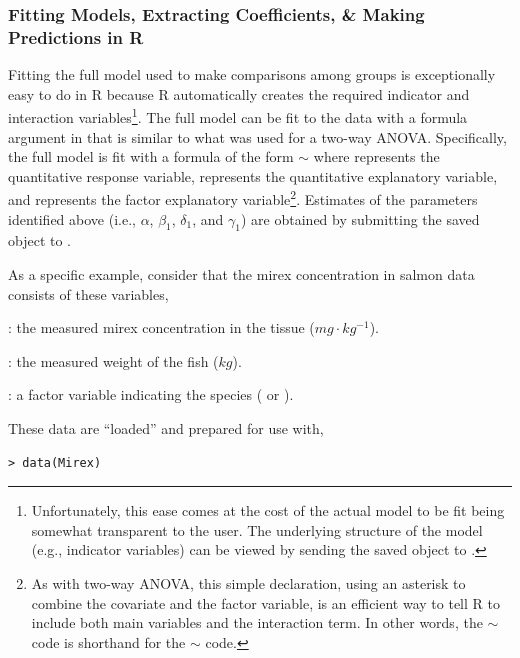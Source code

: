 \documentclass[10pt,openany]{book}\usepackage[]{graphicx}\usepackage[]{color}
\makeatletter
\newenvironment{kframe}{%
 \def\at@end@of@kframe{}%
 \ifinner\ifhmode%
  \def\at@end@of@kframe{\end{minipage}}%
  \begin{minipage}{\columnwidth}%
 \fi\fi%
 \def\FrameCommand##1{\hskip\@totalleftmargin \hskip-\fboxsep
 \colorbox{shadecolor}{##1}\hskip-\fboxsep
     \hskip-\linewidth \hskip-\@totalleftmargin \hskip\columnwidth}%
 \MakeFramed {\advance\hsize-\width
   \@totalleftmargin\z@ \linewidth\hsize
   \@setminipage}}%
 {\par\unskip\endMakeFramed%
 \at@end@of@kframe}
\newenvironment{knitrout}{}{} %
\makeatother
\begin{document}
\subsubsection*{Fitting Models, Extracting Coefficients, \& Making Predictions in R}
Fitting the full model used to make comparisons among groups is exceptionally easy to do in R because R automatically creates the required indicator and interaction variables\footnote{Unfortunately, this ease comes at the cost of the actual model to be fit being somewhat transparent to the user.  The underlying structure of the model (e.g., indicator variables) can be viewed by sending the saved  object to .}.  The full model can be fit to the data with a formula argument in  that is similar to what was used for a two-way ANOVA.  Specifically, the full model is fit with a formula of the form $\sim$ where  represents the quantitative response variable,  represents the quantitative explanatory variable, and  represents the factor explanatory variable\footnote{As with two-way ANOVA, this simple declaration, using an asterisk to combine the covariate and the factor variable, is an efficient way to tell R to include both main variables and the interaction term.  In other words, the $\sim$ code is shorthand for the $\sim$ code.}.  Estimates of the parameters identified above (i.e., $\alpha$, $\beta_{1}$, $\delta_{1}$, and $\gamma_{1}$) are obtained by submitting the saved  object to .

As a specific example, consider that the mirex concentration in salmon data consists of these variables,
\begin{Enumerate}
  \item {}: the measured mirex concentration in the tissue ($mg\cdot kg^{-1}$).
  \item {}: the measured weight of the fish ($kg$).
  \item {}: a factor variable indicating the species ( or ).
\end{Enumerate}
These data are ``loaded'' and prepared for use with,
\begin{knitrout}
\color{fgcolor}\begin{kframe}
\begin{verbatim}
> data(Mirex)
\end{verbatim}
\end{kframe}
\end{knitrout}
\end{document}
